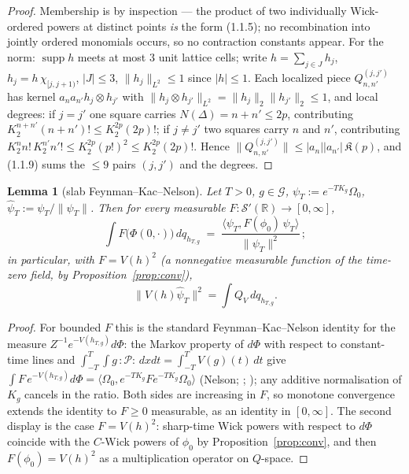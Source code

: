 \documentclass[11pt,a4paper]{article}
\theoremstyle{plain}
\newtheorem{lemma}[theorem]{Lemma}
\theoremstyle{definition}
\newcommand{\R}{\mathbb{R}}
\newcommand{\Om}{\Omega}
\newcommand{\G}{\mathcal{G}}
\newcommand{\ip}[2]{\langle #1,#2\rangle}
\DeclareMathOperator{\supp}{supp}
\begin{document}
\begin{proof}
Membership is by inspection --- the product of two individually Wick-ordered powers at distinct
points \emph{is} the form (1.1.5); no recombination into jointly ordered monomials occurs, so no
contraction constants appear. For the norm: $\supp h$ meets at most $3$ unit lattice cells; write
$h=\sum_{j\in J}h_j$, $h_j=h\,\chi_{[j,j+1)}$, $|J|\le3$, $\|h_j\|_{L^2}\le1$ since $|h|\le1$.
Each localized piece $Q^{(j,j')}_{n,n'}$ has kernel $a_na_{n'}h_j\otimes h_{j'}$ with
$\|h_j\otimes h_{j'}\|_{L^2}=\|h_j\|_2\|h_{j'}\|_2\le1$, and local degrees: if $j=j'$ one square
carries $N(\Delta)=n+n'\le2p$, contributing $K_2^{n+n'}(n+n')!\le K_2^{2p}(2p)!$; if $j\ne j'$ two
squares carry $n$ and $n'$, contributing $K_2^{n}n!\,K_2^{n'}n'!\le K_2^{2p}(p!)^2\le K_2^{2p}(2p)!$.
Hence $\|Q^{(j,j')}_{n,n'}\|\le|a_n||a_{n'}|\,\mathfrak K(p)$, and (1.1.9) sums the $\le9$ pairs
$(j,j')$ and the degrees.
\end{proof}

\begin{lemma}[slab Feynman--Kac--Nelson]\label{lem:B}
Let $T>0$, $g\in\G$, $\psi_T:=e^{-TK_g}\Om_0$, $\hat\psi_T:=\psi_T/\|\psi_T\|$. Then for every
measurable $F:\mathcal S'(\R)\to[0,\infty]$,
\[
  \int F\bigl(\Phi(0,\cdot)\bigr)\,dq_{h_{T,g}}
  \;=\;\frac{\ip{\psi_T}{F(\phi_0)\,\psi_T}}{\|\psi_T\|^2}\,;
\]
in particular, with $F=V(h)^2$ (a nonnegative measurable function of the time-zero field, by
Proposition~\ref{prop:conv}),
\[
  \bigl\|V(h)\hat\psi_T\bigr\|^2=\int Q_V\,dq_{h_{T,g}} .
\]
\end{lemma}

\begin{proof}
For bounded $F$ this is the standard Feynman--Kac--Nelson identity for the measure
$Z^{-1}e^{-V(h_{T,g})}d\Phi$: the Markov property of $d\Phi$ with respect to constant-time lines
and $\int_{-T}^{T}\!\!\int g\,{:}\mathscr P{:}\,dxdt=\int_{-T}^{T}V(g)(t)\,dt$ give
$\int F\,e^{-V(h_{T,g})}d\Phi=\ip{\Om_0}{e^{-TK_g}Fe^{-TK_g}\Om_0}$ (Nelson; \cite[Thm.~III.12]{SimonBook};
\cite{GRS75}); any additive normalisation of $K_g$ cancels in the ratio. Both sides are increasing
in $F$, so monotone convergence extends the identity to $F\ge0$ measurable, as an identity in
$[0,\infty]$. The second display is the case $F=V(h)^2$: sharp-time Wick powers with respect to
$d\Phi$ coincide with the $C$-Wick powers of $\phi_0$ by Proposition~\ref{prop:conv}, and then
$F(\phi_0)=V(h)^2$ as a multiplication operator on $Q$-space.
\end{proof}
\end{document}
